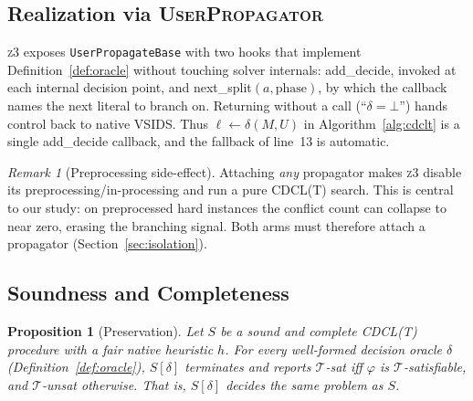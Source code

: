 \documentclass[letterpaper]{article} %
\theoremstyle{definition}
\theoremstyle{plain}
\newtheorem{proposition}{Proposition}
\theoremstyle{remark}
\newtheorem{remark}{Remark}
\newcommand{\solver}{\textsc{z3}}
\newcommand{\decide}{\textsf{add\_decide}}
\newcommand{\nextsplit}{\textsf{next\_split}}
\newcommand{\Undec}{U}
\newcommand{\defer}{\bot}
\begin{document}
\subsection{Realization via \textsc{UserPropagator}}

\solver{} exposes \texttt{UserPropagateBase} with two hooks that implement
Definition~\ref{def:oracle} without touching solver internals:
\decide{}, invoked at each internal decision point, and \nextsplit{}$(a,
\text{phase})$, by which the callback names the next literal to branch on.
Returning without a call (``$\delta=\defer$'') hands control back to native
VSIDS. Thus $\ell\gets\delta(M,\Undec)$ in Algorithm~\ref{alg:cdclt} is a
single \decide{} callback, and the fallback of line~13 is automatic.

\begin{remark}[Preprocessing side-effect]
\label{rem:preproc}
Attaching \emph{any} propagator makes \solver{} disable its
preprocessing/in-processing and run a pure \textsc{CDCL(T)} search. This is
central to our study: on preprocessed hard instances the conflict count can
collapse to near zero, erasing the branching signal. Both arms must
therefore attach a propagator (Section~\ref{sec:isolation}).
\end{remark}

\subsection{Soundness and Completeness}

\begin{proposition}[Preservation]
\label{prop:sc}
Let $S$ be a sound and complete \textsc{CDCL(T)} procedure with a fair native
heuristic $h$. For every well-formed decision oracle $\delta$
(Definition~\ref{def:oracle}), $S[\delta]$ terminates and reports
$\mathcal{T}$-sat iff $\varphi$ is $\mathcal{T}$-satisfiable, and
$\mathcal{T}$-unsat otherwise. That is, $S[\delta]$ decides the same problem
as $S$.
\end{proposition}
\end{document}
